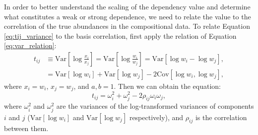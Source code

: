 In order to better understand the scaling of the dependency value and determine what constitutes a weak or strong dependence, we need to relate the value to the correlation of the true abundances in the compositional data. To relate Equation \ref{eq:tij_variance} to the basis correlation, first apply the relation of Equation \ref{eq:var_relation}:
\begin{equation}\label{eq:basis_correlation}
    \begin{split}
        t_{ij} & \equiv \text{Var}\left[ \log \frac{x_i}{x_j}\right] = \text{Var}\left[ \log \frac{w_i}{w_j}\right]=\text{Var}\left[ \log w_i - \log w_j \right], \\
        & = \text{Var}\left[ \log w_i\right]+\text{Var}\left[\log w_j\right] - 2\text{Cov}\left[\log w_i, \log w_j\right],
    \end{split}
\end{equation}
where $x_i = w_i$, $x_j = w_j$, and  $a,b = 1$. Then we can obtain the equation:
\begin{equation}\label{eq:abun_relation}
    t_{ij} = \omega^2_i + \omega^2_j - 2 \rho_{ij} \omega_i \omega_j,
\end{equation}
where $\omega_i^2$ and $\omega_j^2$ are the variances of the log-transformed variances of components $i$ and $j$ ($\text{Var}\left[ \log w_i\right]$ and $\text{Var}\left[\log w_j\right]$ respectively), and $\rho_{ij}$ is the correlation between them. 


